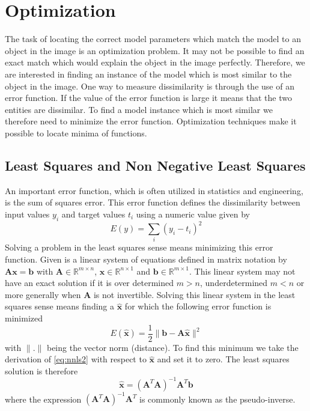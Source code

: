 \documentclass[11pt,a4paper,twoside]{report}
\begin{document}
\section{Optimization}
The task of locating the correct model parameters which match the model to an
object in the image is an optimization problem. It may not be possible to find
an exact match which would explain the object in the image perfectly. Therefore,
we are interested in finding an instance of the model which is most similar to the
object in the image. One way to measure dissimilarity is through the use of an error function. If the
value of the error function is large it means that the two entities are
dissimilar. To find a model instance which is most similar we therefore need to
minimize the error function. Optimization techniques make it possible to locate
minima of functions.

\subsection{Least Squares and Non Negative Least Squares}
An important error function, which is often utilized in statistics and engineering, is the
sum of squares error. This error function defines the dissimilarity between input
values $y_i$ and target values $t_i$ using a numeric value given by
\begin{equation}\label{eq:nnls}
E(y) = \sum_i (y_i - t_i)^2
\end{equation}
Solving a problem in the least squares sense means minimizing this error
function. Given is a linear system of equations defined in matrix notation by
$\mathbf{A}\mathbf{x} = \mathbf{b}$ with $\mathbf{A} \in \mathbb{R}^{m\times
  n}$, $\mathbf{x} \in \mathbb{R}^{n\times 1}$ and $\mathbf{b} \in
\mathbb{R}^{m\times 1}$. This linear system may not have an exact solution if it
is over determined $m > n$, underdetermined $m < n$  or more generally when
$\mathbf{A}$ is not invertible. Solving this linear system in the least squares sense
means finding a $\mathbf{\hat{x}}$ for which the following error function is
minimized
\begin{equation}\label{eq:nnls2}
E(\mathbf{\hat{x}}) = \frac{1}{2}\lVert \mathbf{b} - \mathbf{A\hat{x}} \rVert^2
\end{equation}
with $\lVert . \rVert$ being the vector norm (distance).
To find this minimum we take the derivation of \ref{eq:nnls2} with respect to
$\mathbf{\hat{x}}$ and set it to zero. The least squares solution is therefore
\begin{equation}\label{eq:nnls2}
\mathbf{\hat{x}} = (\mathbf{A}^T\mathbf{A})^{-1}\mathbf{A}^T\mathbf{b}
\end{equation}
where the expression $(\mathbf{A}^T\mathbf{A})^{-1}\mathbf{A}^T$ is commonly
known as the pseudo-inverse.
\end{document}
